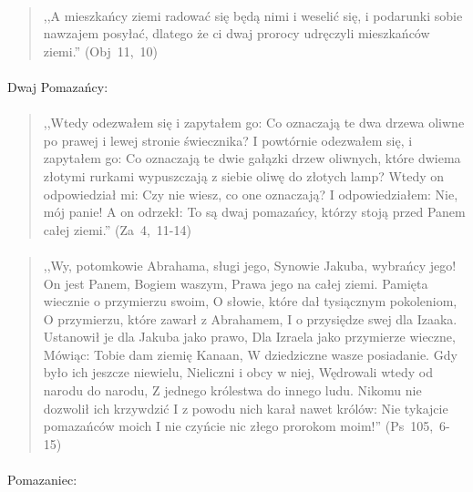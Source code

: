 \documentclass[10pt,a4paper,oneside]{article}
\begin{document}
\paragraph{}
\begin{quote}
,,A mieszkańcy ziemi radować się będą nimi i weselić się, i podarunki sobie nawzajem posyłać, dlatego że ci dwaj prorocy udręczyli mieszkańców ziemi.'' \mbox{(Obj 11, 10)}
\end{quote}
\paragraph{}
Dwaj Pomazańcy:
\paragraph{}
\begin{quote}
,,Wtedy odezwałem się i zapytałem go: Co oznaczają te dwa drzewa oliwne po prawej i lewej stronie świecznika? I powtórnie odezwałem się, i zapytałem go: Co oznaczają te dwie gałązki drzew oliwnych, które dwiema złotymi rurkami wypuszczają z siebie oliwę do złotych lamp? Wtedy on odpowiedział mi: Czy nie wiesz, co one oznaczają? I odpowiedziałem: Nie, mój panie! A on odrzekł: To są dwaj pomazańcy, którzy stoją przed Panem całej ziemi.'' \mbox{(Za 4, 11-14)}
\end{quote}
\paragraph{}
\begin{quote}
,,Wy, potomkowie Abrahama, sługi jego, Synowie Jakuba, wybrańcy jego! On jest Panem, Bogiem waszym, Prawa jego na całej ziemi. Pamięta wiecznie o przymierzu swoim, O słowie, które dał tysiącznym pokoleniom, O przymierzu, które zawarł z Abrahamem, I o przysiędze swej dla Izaaka. Ustanowił je dla Jakuba jako prawo, Dla Izraela jako przymierze wieczne, Mówiąc: Tobie dam ziemię Kanaan, W dziedziczne wasze posiadanie. Gdy było ich jeszcze niewielu, Nieliczni i obcy w niej, Wędrowali wtedy od narodu do narodu, Z jednego królestwa do innego ludu. Nikomu nie dozwolił ich krzywdzić I z powodu nich karał nawet królów: Nie tykajcie pomazańców moich I nie czyńcie nic złego prorokom moim!'' \mbox{(Ps 105, 6-15)}
\end{quote}
\paragraph{}
Pomazaniec:
\end{document}
